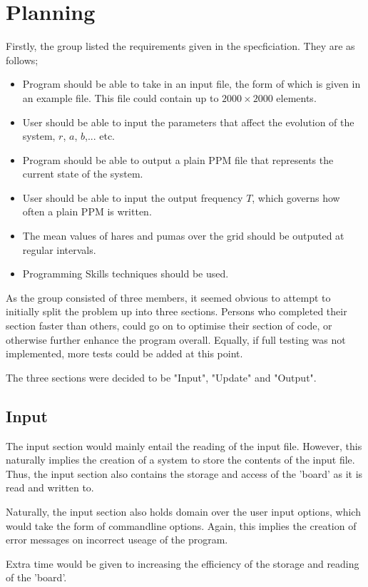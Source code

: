 \section{Planning}
	Firstly, the group listed the requirements given in the specficiation.
	They are as follows;
	\begin{itemize}
		\item Program should be able to take in an input file, the form of which is given in an example file.
			This file could contain up to $2000\times2000$ elements.
		\item User should be able to input the parameters that affect the evolution of the system, $r$, $a$, $b$,... etc.
		\item Program should be able to output a plain PPM file that represents the current state of the system.
		\item User should be able to input the output frequency $T$, which governs how often a plain PPM is written.
		\item The mean values of hares and pumas over the grid should be outputed at regular intervals.
		\item Programming Skills techniques should be used.
	\end{itemize}
	As the group consisted of three members, it seemed obvious to attempt to initially split the problem up into three sections.
	Persons who completed their section faster than others, could go on to optimise their section of code, or otherwise further enhance the program overall.
	Equally, if full testing was not implemented, more tests could be added at this point.
	
	The three sections were decided to be "Input", "Update" and "Output".

	\subsection{Input}
		The input section would mainly entail the reading of the input file.
		However, this naturally implies the creation of a system to store the contents of the input file.
		Thus, the input section also contains the storage and access of the 'board' as it is read and written to.
		
		Naturally, the input section also holds domain over the user input options, which would take the form of commandline options.
		Again, this implies the creation of error messages on incorrect useage of the program.
		
		Extra time would be given to increasing the efficiency of the storage and reading of the 'board'.
